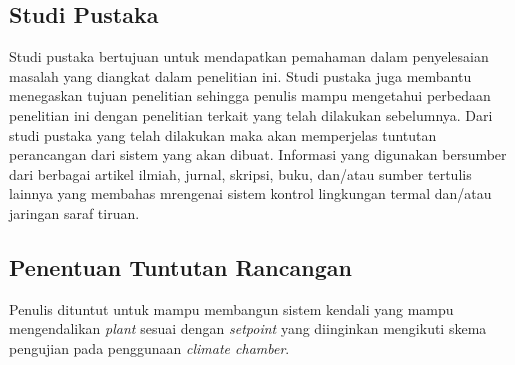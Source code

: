 

\subsection{Studi Pustaka}
Studi pustaka bertujuan untuk mendapatkan pemahaman dalam penyelesaian masalah yang diangkat dalam penelitian ini. Studi pustaka juga membantu menegaskan tujuan penelitian sehingga penulis mampu mengetahui perbedaan penelitian ini dengan penelitian terkait yang telah dilakukan sebelumnya. Dari studi pustaka yang telah dilakukan maka akan memperjelas tuntutan perancangan dari sistem yang akan dibuat. Informasi yang digunakan bersumber dari berbagai artikel ilmiah, jurnal, skripsi, buku, dan/atau sumber tertulis lainnya yang membahas mrengenai sistem kontrol lingkungan termal dan/atau jaringan saraf tiruan.

\subsection{Penentuan Tuntutan Rancangan}

Penulis dituntut untuk mampu membangun sistem kendali yang mampu mengendalikan \textit{plant} sesuai dengan \textit{setpoint} yang diinginkan mengikuti skema pengujian pada penggunaan \textit{climate chamber}.

